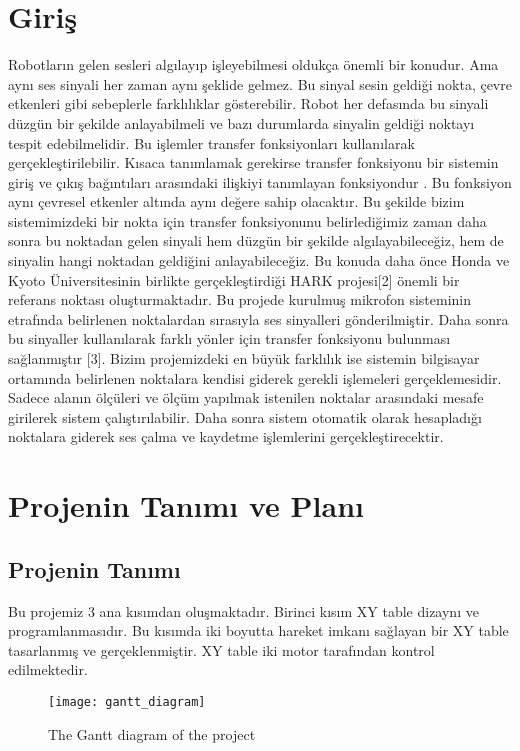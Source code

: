 \documentclass[a4paper, 12pt, titlepage]{article}
\begin{document}
\newpage
\tableofcontents
\newpage

\section{Giriş}
Robotların gelen sesleri algılayıp işleyebilmesi oldukça önemli bir konudur. Ama aynı ses sinyali her zaman aynı şeklide gelmez. Bu sinyal sesin geldiği nokta, çevre etkenleri gibi sebeplerle farklılıklar gösterebilir. Robot her defasında bu sinyali düzgün bir şekilde anlayabilmeli ve bazı durumlarda sinyalin geldiği noktayı tespit edebilmelidir. Bu işlemler transfer fonksiyonları kullanılarak gerçekleştirilebilir.
Kısaca tanımlamak gerekirse transfer fonksiyonu bir sistemin giriş ve çıkış bağıntıları arasındaki ilişkiyi tanımlayan fonksiyondur \cite {transfer function}. Bu fonksiyon aynı çevresel etkenler altında aynı değere sahip olacaktır. Bu şekilde bizim sistemimizdeki bir nokta için transfer fonksiyonunu belirlediğimiz zaman daha sonra bu noktadan gelen sinyali hem düzgün bir şekilde algılayabileceğiz, hem de sinyalin hangi noktadan geldiğini anlayabileceğiz.
Bu konuda daha önce Honda ve Kyoto Üniversitesinin birlikte gerçekleştirdiği HARK projesi[2] önemli bir referans noktası oluşturmaktadır. Bu projede kurulmuş mikrofon sisteminin etrafında belirlenen noktalardan sırasıyla ses sinyalleri gönderilmiştir. Daha sonra bu sinyaller kullanılarak farklı yönler için transfer fonksiyonu bulunması sağlanmıştır [3].
Bizim projemizdeki en büyük farklılık ise sistemin bilgisayar ortamında belirlenen noktalara kendisi giderek gerekli işlemeleri gerçeklemesidir. Sadece alanın ölçüleri ve ölçüm yapılmak istenilen noktalar arasındaki mesafe girilerek sistem çalıştırılabilir. Daha sonra sistem otomatik olarak hesapladığı noktalara giderek ses çalma ve kaydetme işlemlerini gerçekleştirecektir.
\newpage
\section{Projenin Tanımı ve Planı}
\subsection{Projenin Tanımı}
Bu projemiz 3 ana kısımdan oluşmaktadır. Birinci kısım XY table dizaynı ve programlanmasıdır. Bu kısımda iki boyutta hareket imkanı sağlayan bir XY table tasarlanmış ve gerçeklenmiştir. XY table iki motor tarafından kontrol edilmektedir. 
\begin{figure}[H]
    \centering
    \texttt{[image: gantt\_diagram]}
    \caption{The Gantt diagram of the project}
    \label{fig:ganttdiagram}
\end{figure}
\end{document}
